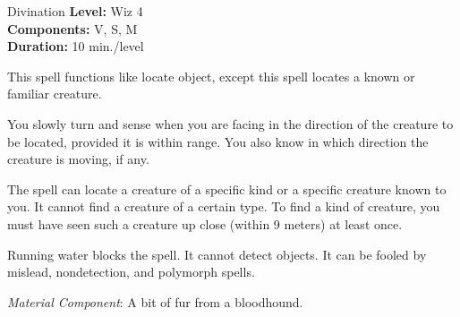 {Divination}
{
	\textbf{Level:}
	Wiz 4\\
	\textbf{Components:}
	V, S, M\\
	\textbf{Duration:}
	10 min./level\\
}
{
	This spell functions like locate object, except this spell locates a known or familiar creature.

	You slowly turn and sense when you are facing in the direction of the creature to be located, provided it is within range. You also know in which direction the creature is moving, if any.

	The spell can locate a creature of a specific kind or a specific creature known to you. It cannot find a creature of a certain type. To find a kind of creature, you must have seen such a creature up close (within 9 meters) at least once.

	Running water blocks the spell. It cannot detect objects. It can be fooled by mislead, nondetection, and polymorph spells.

	\textit{Material Component}:
	A bit of fur from a bloodhound.

}
